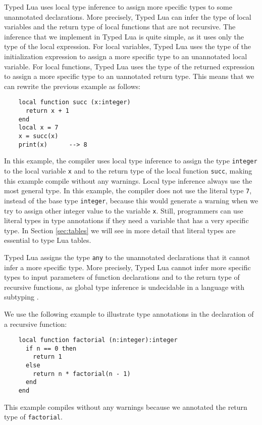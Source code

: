 Typed Lua uses local type inference to assign more specific types to
some unannotated declarations.
More precisely, Typed Lua can infer the type of local variables and
the return type of local functions that are not recursive.
The inference that we implement in Typed Lua is quite simple, as it
uses only the type of the local expression.
For local variables, Typed Lua uses the type of the initialization
expression to assign a more specific type to an unannotated local variable.
For local functions, Typed Lua uses the type of the returned expression
to assign a more specific type to an uannotated return type.
This means that we can rewrite the previous example as follows:
\begin{verbatim}
    local function succ (x:integer)
      return x + 1
    end
    local x = 7
    x = succ(x)
    print(x)      --> 8
\end{verbatim}

In this example, the compiler uses local type inference to assign the
type \texttt{integer} to the local variable \texttt{x} and to the
return type of the local function \texttt{succ}, making this example
compile without any warnings.
Local type inference always use the most general type.
In this example, the compiler does not use the literal type \texttt{7},
instead of the base type \texttt{integer}, because this would generate
a warning when we try to assign other integer value to the variable \texttt{x}.
Still, programmers can use literal types in type annotations if
they need a variable that has a very specific type.
In Section \ref{sec:tables} we will see in more detail that literal
types are essential to type Lua tables.

Typed Lua assigns the type \texttt{any} to the unannotated declarations
that it cannot infer a more specific type.
More precisely, Typed Lua cannot infer more specific types to input
parameters of function declarations and to the return type of
recursive functions, as global type inference is undecidable in a
language with subtyping \citep{wells1999typability}.

We use the following example to illustrate type annotations in the
declaration of a recursive function:
\begin{verbatim}
    local function factorial (n:integer):integer
      if n == 0 then
        return 1
      else
        return n * factorial(n - 1)
      end
    end
\end{verbatim}

This example compiles without any warnings because we annotated
the return type of \texttt{factorial}.


